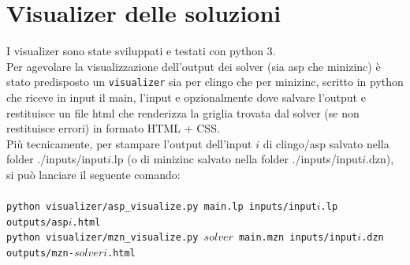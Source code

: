 \documentclass{article}
\begin{document}
\section{Visualizer delle soluzioni}
I visualizer sono state sviluppati e testati con python 3.\\
Per agevolare la visualizzazione dell'output dei solver (sia asp che minizinc) è stato predisposto un \texttt{visualizer} sia per clingo che per minizinc, scritto in python che riceve in input il main, l'input e opzionalmente dove salvare l'output e restituisce un file html che renderizza la griglia trovata dal solver (se non restituisce errori) in formato HTML + CSS.\\
Più tecnicamente, per stampare l'output dell'input $i$ di clingo/asp salvato nella folder ./inputs/input$i$.lp (o di minizinc salvato nella folder ./inputs/input$i$.dzn), si può lanciare il seguente comando:\\\\
\hspace*{.5cm}\texttt{python visualizer/asp\_visualize.py main.lp inputs/input$i$.lp outputs/asp$i$.html}\\
\hspace*{.5cm}\texttt{python visualizer/mzn\_visualize.py $solver$ main.mzn inputs/input$i$.dzn outputs/mzn-$solver$$i$.html}\\\\
\end{document}
